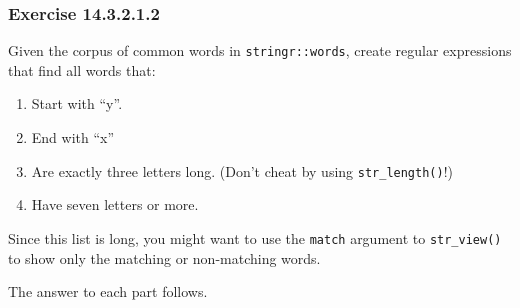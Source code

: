 \documentclass[]{book}
\providecommand{\tightlist}{%
  \setlength{\itemsep}{0pt}\setlength{\parskip}{0pt}}
\theoremstyle{plain}
\theoremstyle{remark}
\begin{document}
\hypertarget{exercise-14.3.2.1.2}{%
\subsubsection*{\texorpdfstring{Exercise
{14.3.2.1.2}}{Exercise 14.3.2.1.2}}\label{exercise-14.3.2.1.2}}

Given the corpus of common words in \texttt{stringr::words}, create
regular expressions that find all words that:

\begin{enumerate}
\def\labelenumi{\arabic{enumi}.}
\tightlist
\item
  Start with ``y''.
\item
  End with ``x''
\item
  Are exactly three letters long. (Don't cheat by using
  \texttt{str\_length()}!)
\item
  Have seven letters or more.
\end{enumerate}

Since this list is long, you might want to use the \texttt{match}
argument to \texttt{str\_view()} to show only the matching or
non-matching words.

The answer to each part follows.
\end{document}
